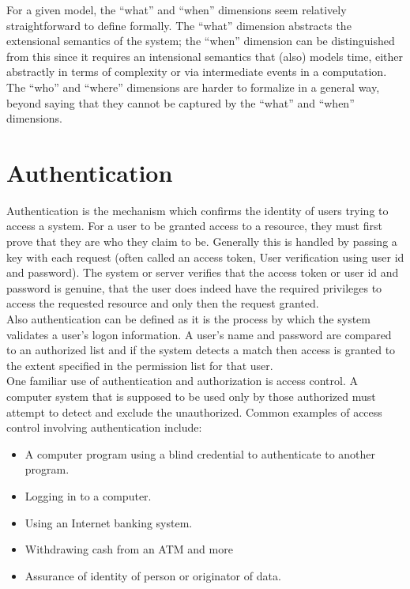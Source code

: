 For a given model, the \enquote{what} and \enquote{when} dimensions seem relatively straightforward to define formally. The \enquote{what} dimension abstracts the extensional semantics
of the system; the \enquote{when} dimension can be distinguished from this since it requires an intensional semantics that (also) models time, either abstractly in terms of complexity
or via intermediate events in a computation. The \enquote{who} and \enquote{where} dimensions are
harder to formalize in a general way, beyond saying that they cannot be captured by the
\enquote{what} and \enquote{when} dimensions.

\section{Authentication}
Authentication is the mechanism which confirms the identity of users trying to access a system. For a user to be granted access to a resource, they must first prove that they are who they claim to be. Generally this is handled by passing a key with each request (often called an access token, User verification using user id and password). The system or server verifies that the access token or user id and password is genuine, that the user does indeed have the required privileges to access the requested resource and only then the request granted.\\
Also authentication can be defined as it is the process by which the system validates a user's logon information. A user's name and password are compared to an authorized list and if the system detects a match then access is granted to the extent specified in the permission list for that user.\\

One familiar use of authentication and authorization is access control. A computer system that is supposed to be used only by those authorized must attempt to detect and exclude the unauthorized. Common examples of access control involving authentication include:
\begin{itemize}	
	\item A computer program using a blind credential to authenticate to another program.
	\item Logging in to a computer.	
	\item Using an Internet banking system.
	\item Withdrawing cash from an ATM and more
	\item Assurance of identity of person or originator of data.
\end{itemize}

